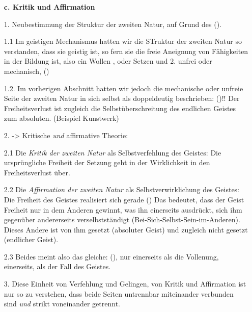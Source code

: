 \documentclass[12pt, a4paper, openany]{report}
\begin{document}
\begin{itemize}
    \item[] \textbf{c. Kritik und Affirmation}
    \item[1.] Neubestimmung der Struktur der zweiten Natur, auf Grund des  (\cite[][145]{menke_autonomie_2018}).
    \item[1.1] Im geistigen Mechanismus hatten wir die STruktur der zweiten Natur so verstanden, dass sie geistig ist, so fern sie die freie Aneignung von Fähigkeiten in der Bildung ist, also ein Wollen , oder Setzen und 2. unfrei oder mechanisch,  (\cite[][145]{menke_autonomie_2018})
    \item[1.2.] Im vorherigen Abschnitt hatten wir jedoch die mechanische oder unfreie Seite der zweiten Natur in sich selbst als doppeldeutig beschrieben: 
     (\cite[][145]{menke_autonomie_2018})!!
    Der Freiheitsverlust ist zugleich die Selbstüberschreitung des endlichen Geistes zum absoluten. (Beispiel Kunstwerk)
    \item[2.] -> Kritische \emph{und} affirmative Theorie:
    \item[2.1] Die \emph{Kritik der zweiten Natur} als Selbstverfehlung des Geistes:
        Die ursprüngliche Freiheit der Setzung geht in der Wirklichkeit in den Freiheitsverlust über.
    \item[2.2] Die \emph{Affirmation der zweiten Natur} als Selbstverwirklichung des Geistes:
        Die Freiheit des Geistes realisiert sich gerade  (\cite[][145]{menke_autonomie_2018})
        Das bedeutet, dass der Geist Freiheit nur in dem Anderen gewinnt, was ihn einerseits ausdrückt, sich ihm gegenüber andererseits verselbstständigt (Bei-Sich-Selbst-Sein-im-Anderen). 
        Dieses Andere ist von ihm gesetzt (absoluter Geist) und zugleich nicht gesetzt (endlicher Geist).
    \item[2.3] Beides meint also das gleiche:  (\cite[][146]{menke_autonomie_2018}), nur einerseits als die Vollenung, einerseits, als der Fall des Geistes.
    \item[3.] Diese Einheit von Verfehlung und Gelingen, von Kritik und Affirmation ist nur so zu verstehen, dass beide Seiten untrennbar miteinander verbunden sind \emph{und} strikt voneinander getrennt.

\end{itemize}
\end{document}
